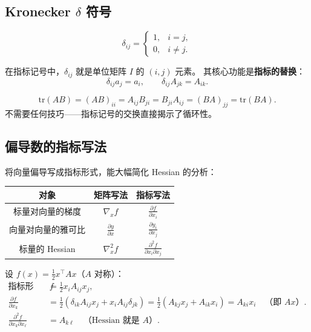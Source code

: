 \subsection{Kronecker $\delta$ 符号}

\begin{equation}
    \delta_{ij} =
    \begin{cases}
        1, & i = j, \\
        0, & i \neq j.
    \end{cases}
\end{equation}

在指标记号中，$\delta_{ij}$ 就是单位矩阵 $I$ 的 $(i,j)$ 元素。
其核心功能是\textbf{指标的替换}：
\begin{equation}
    \delta_{ij} a_j = a_i, \qquad
    \delta_{ij} A_{jk} = A_{ik}.
\end{equation}

\begin{example}[迹的循环性在指标记号下是显然的]
\begin{equation}
    \mathrm{tr}(AB) = (AB)_{ii} = A_{ij} B_{ji} = B_{ji} A_{ij} = (BA)_{jj} = \mathrm{tr}(BA).
\end{equation}
不需要任何技巧——指标记号的交换直接揭示了循环性。
\end{example}

\subsection{偏导数的指标写法}

将向量偏导写成指标形式，能大幅简化 Hessian 的分析：

\begin{center}
\renewcommand{\arraystretch}{1.8}
\begin{tabular}{c|c|c}
\toprule
\textbf{对象} & \textbf{矩阵写法} & \textbf{指标写法} \\
\midrule
标量对向量的梯度 & $\nabla_x f$ & $\displaystyle\frac{\partial f}{\partial x_i}$ \\
向量对向量的雅可比 & $\displaystyle\frac{\partial y}{\partial x}$ & $\displaystyle\frac{\partial y_i}{\partial x_j}$ \\
标量的 Hessian & $\nabla^2_x f$ & $\displaystyle\frac{\partial^2 f}{\partial x_i \partial x_j}$ \\
\bottomrule
\end{tabular}
\end{center}

\begin{example}
设 $f(x) = \frac{1}{2}x^\top A x$（$A$ 对称）：
\begin{align}
    \text{指标形式：}\quad f &= \frac{1}{2} x_i A_{ij} x_j, \\
    \frac{\partial f}{\partial x_k}
    &= \frac{1}{2}(\delta_{ik} A_{ij} x_j + x_i A_{ij} \delta_{jk})
     = \frac{1}{2}(A_{kj} x_j + A_{ik} x_i)
     = A_{ki} x_i \quad \text{（即 } Ax \text{）.} \\[4pt]
    \frac{\partial^2 f}{\partial x_k \partial x_\ell}
    &= A_{k\ell} \quad \text{（Hessian 就是 } A \text{）.}
\end{align}
\end{example}

